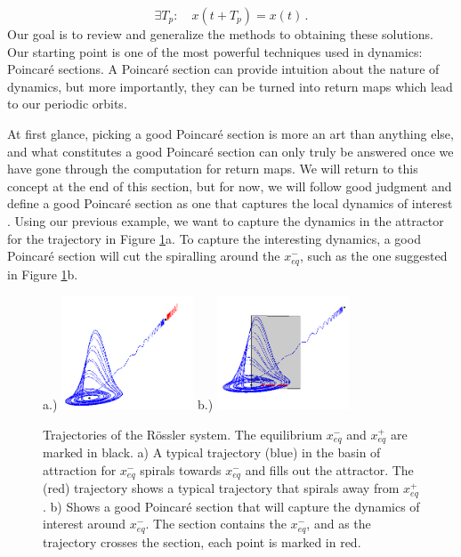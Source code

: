 \documentclass[aip,cha,reprint,
secnumarabic,
nofootinbib, tightenlines,
nobibnotes, showkeys, showpacs,
groupedaddress
]{revtex4-1}
\begin{document}
\begin{equation}
\exists T_p : \quad  x(t+T_p) = x(t) \,.
  \label{eq:PerTraj}
\end{equation}
Our goal is to review and generalize the methods to obtaining these solutions.  Our starting point is one of the most powerful techniques used in dynamics: Poincar\'e sections.  A Poincar\'e section can provide intuition about the nature of dynamics, but more importantly, they can be turned into return maps which lead to our periodic orbits.

At first glance, picking a good Poincar\'e section is more an art than anything else, and what constitutes a good Poincar\'e section can only truly be answered once we have gone through the computation for return maps.  We will return to this concept at the end of this section, but for now, we will follow good judgment and define a good Poincar\'e section as one that captures the local dynamics of interest \cite{CB}.  Using our previous example, we want to capture the dynamics in the attractor for the trajectory in Figure \ref{fig:RossTraj}a.  To capture the interesting dynamics, a good Poincar\'e section will cut the spiralling around the $x_{eq}^{-}$, such as the one suggested in Figure \ref{fig:RossTraj}b.

 \begin{figure}[h]
\centering
a.)  \includegraphics[width=0.35\textwidth]{Figs/Section1/kcRosslerTrajc.png}
b.)
  \includegraphics[width=0.35\textwidth]{Figs/Section1/kcRosslerTrajwithPSc.png}
\caption{Trajectories of the R\"ossler system.  The equilibrium $x_{eq}^{-}$ and $x_{eq}^{+}$ are marked in black.  a) A typical trajectory (blue) in the basin of attraction for $x_{eq}^{-}$ spirals towards $x_{eq}^{-}$ and fills out the attractor.  The (red) trajectory shows a typical trajectory that spirals away from $x_{eq}^{+}$.  b) Shows a good Poincar\'e section that will capture the dynamics of interest around $x_{eq}^{-}$.  The section contains the $x_{eq}^{-}$, and as the trajectory crosses the section, each point is marked in red.}
 \label{fig:RossTraj}
\end{figure}
\end{document}
